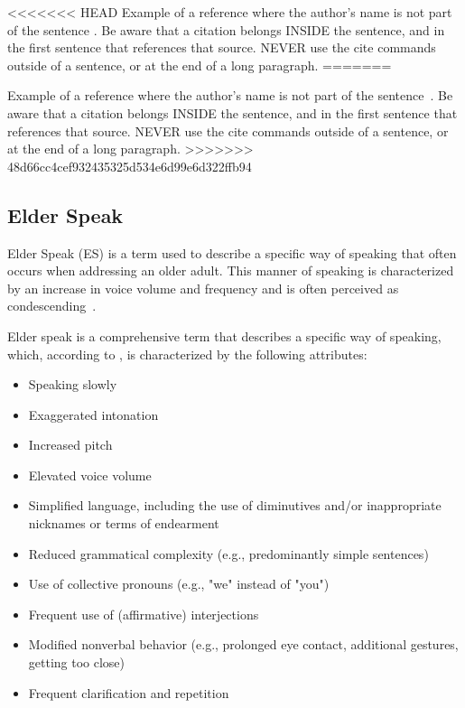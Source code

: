 \documentclass[english]{hogent-article}
\begin{document}
<<<<<<< HEAD
Example of a reference where the author's name is not part of the sentence \autocite{Moore2002}. Be aware that a citation belongs INSIDE the sentence, and in the first sentence that references that source. NEVER use the cite commands outside of a sentence, or at the end of a long paragraph.
=======

Example of a reference where the author's name is not part of the sentence~\autocite{Moore2002}. Be aware that a citation belongs INSIDE the sentence, and in the first sentence that references that source. NEVER use the cite commands outside of a sentence, or at the end of a long paragraph.
>>>>>>> 48d66cc4cef932435325d534e6d99e6d322ffb94

\subsection{Elder Speak}
Elder Speak (ES) is a term used to describe a specific way of speaking that often occurs when addressing an older adult. This manner of speaking is characterized by an increase in voice volume and frequency and is often perceived as condescending~\autocite{SteveBalsis2006}.

Elder speak is a comprehensive term that describes a specific way of speaking, which, according to \cite{Campens2021}, is characterized by the following attributes:

\begin{itemize}
    \item Speaking slowly
    \item Exaggerated intonation
    \item Increased pitch
    \item Elevated voice volume
    \item Simplified language, including the use of diminutives and/or inappropriate nicknames or terms of endearment
    \item Reduced grammatical complexity (e.g., predominantly simple sentences)
    \item Use of collective pronouns (e.g., "we" instead of "you")
    \item Frequent use of (affirmative) interjections
    \item Modified nonverbal behavior (e.g., prolonged eye contact, additional gestures, getting too close)
    \item Frequent clarification and repetition
\end{itemize}
\end{document}
